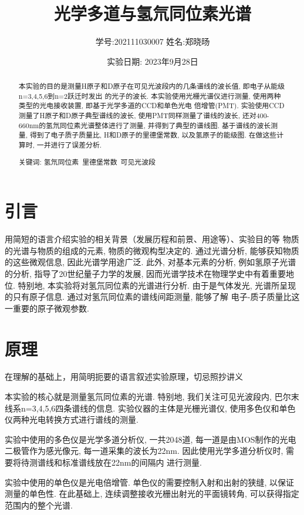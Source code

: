 \documentclass[12pt,a4paper]{article}
\title{\vspace{-4cm}\Large 光学多道与氢氘同位素光谱}  %
\author{\kaishu 学号:202111030007 \hspace{2cm} 姓名:郑晓旸}   %
\date{\kaishu  实验日期: 2023年9月28日}
\begin{document}
\maketitle

\begin{abstract}
    本实验的目的是测量H原子和D原子在可见光波段内的几条谱线的波长值, 即电子从能级n=3,4,5,6到n=2跃迁时发出
    的光子的波长. 本实验使用光栅光谱仪进行测量, 使用两种类型的光电接收装置, 即基于光学多道的CCD和单色光电
    倍增管(PMT). 实验使用CCD测量了H原子和D原子典型谱线的波长, 使用PMT同样测量了谱线的波长, 
    还对400-660nm的氢氘同位素光谱整体进行了测量, 并得到了典型的谱线图. 基于谱线的波长测量, 得到了电子质子质量比, H和D原子的里德堡常数, 以及氢原子的能级图. 
    在做这些计算时, 一并进行了误差分析. 

    关键词: 氢氘同位素\ 里德堡常数\ 可见光波段
\end{abstract}

\section{引言}

用简短的语言介绍实验的相关背景（发展历程和前景、用途等）、实验目的等
物质的光谱与物质的组成的元素, 物质的微观构型决定的. 通过光谱分析, 能够获知物质的这些微观信息, 因此光谱学用途广泛. 
此外, 对基本元素的分析, 例如氢原子光谱的分析, 指导了20世纪量子力学的发展, 因而光谱学技术在物理学史中有着重要地位. 
特别地, 本实验将对氢氘同位素的光谱进行分析. 由于是气体发光, 光谱所呈现的只有原子信息. 通过对氢氘同位素的谱线间距测量, 能够了解
电子-质子质量比这一重要的原子微观参数. 


\section{原理}
在理解的基础上，用简明扼要的语言叙述实验原理，切忌照抄讲义

本实验的核心就是测量氢氘同位素的光谱. 特别地, 我们关注可见光波段内, 巴尔末线系n=3,4,5,6四条谱线的信息. 
实验仪器的主体是光栅光谱仪, 使用多色仪和单色仪两种光电转换方式进行谱线的测量. 

实验中使用的多色仪是光学多道分析仪, 一共2048道, 
每一道是由MOS制作的光电二极管作为感光像元, 每一道采集的波长为22nm. 因此使用光学多道分析仪时, 需要将待测谱线和标准谱线放在22nm的间隔内
进行测量. 

实验中使用的单色仪是光电倍增管. 单色仪的需要控制入射和出射的狭缝, 以保证测量的单色性. 在此基础上, 连续调整接收光栅出射光的平面镜转角, 
可以获得指定范围内的整个光谱. 
\end{document}
